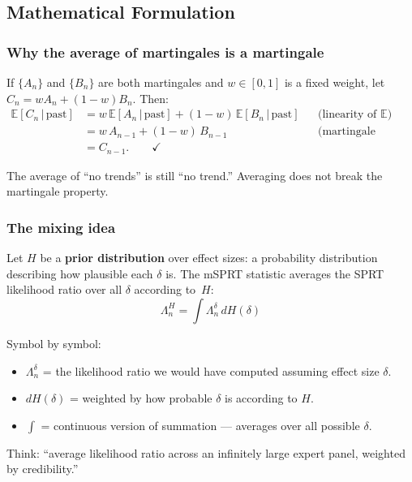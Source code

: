 \documentclass[12pt, a4paper]{article}
\newcommand{\E}{\mathbb{E}}            %
\newcommand{\given}{\,\vert\,}         %
\newcommand{\LR}{\Lambda}              %
\begin{document}
\subsection{Mathematical Formulation}

\subsubsection*{Why the average of martingales is a martingale}

If $\{A_n\}$ and $\{B_n\}$ are both martingales and $w \in [0,1]$ is a fixed
weight, let $C_n = w A_n + (1-w)B_n$.  Then:
\begin{align*}
  \E[C_n \given \text{past}]
  &= w\,\E[A_n \given \text{past}] + (1-w)\,\E[B_n \given \text{past}]
     & &\text{(linearity of $\E$)} \\
  &= w\,A_{n-1} + (1-w)\,B_{n-1}
     & &\text{(martingale property)} \\
  &= C_{n-1}. \qquad\checkmark
\end{align*}

\begin{plainlanguage}
The average of ``no trends'' is still ``no trend.''  Averaging does not break
the martingale property.
\end{plainlanguage}

\subsubsection*{The mixing idea}

Let $H$ be a \textbf{prior distribution} over effect sizes: a probability
distribution describing how plausible each $\delta$ is.  The mSPRT statistic
averages the SPRT likelihood ratio over all $\delta$ according to~$H$:
\[
  \boxed{\LR_n^{H} = \int \LR_n^{\delta} \, dH(\delta)}
\]

\begin{plainlanguage}
Symbol by symbol:
\begin{itemize}[nosep]
  \item $\LR_n^{\delta}$ = the likelihood ratio we would have computed
        assuming effect size $\delta$.
  \item $dH(\delta)$ = weighted by how probable $\delta$ is according to $H$.
  \item $\int$ = continuous version of summation --- averages over all
        possible $\delta$.
\end{itemize}
Think: ``average likelihood ratio across an infinitely large expert panel,
weighted by credibility.''
\end{plainlanguage}
\end{document}
